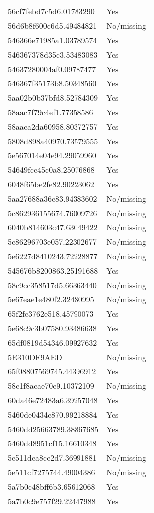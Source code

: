 \begin{tabular}{ll}
56cf7febd7c5d6.01783290 & Yes \\
56d6b8f600c6d5.49484821 & No/missing \\
546366e71985a1.03789574 & Yes \\
546367378d35c3.53483083 & Yes \\
54637280004af0.09787477 & Yes \\
546367f35173b8.50348560 & Yes \\
5aa02b0b37bfd8.52784309 & Yes \\
58aac7f79c4ef1.77358586 & Yes \\
58aaca2da60958.80372757 & Yes \\
5808d898a40970.73579555 & Yes \\
5e567014e04e94.29059960 & Yes \\
54649fce45c0a8.25076868 & Yes \\
6048f65be2fe82.90223062 & Yes \\
5aa27688a36e83.94383602 & No/missing \\
5c862936155674.76009726 & No/missing \\
6040b814603c47.63049422 & No/missing \\
5c86296703e057.22302677 & No/missing \\
5e6227d8410243.72228877 & No/missing \\
545676b8200863.25191688 & Yes \\
58c9cc358517d5.66363440 & No/missing \\
5e67eae1e480f2.32480995 & No/missing \\
65f2fc3762e518.45790073 & Yes \\
5e68c9c3b07580.93486638 & Yes \\
65df0819d54346.09927632 & Yes \\
5E310DF9AED & No/missing \\
65f08807569745.44396912 & Yes \\
58c1f8acae70e9.10372109 & No/missing \\
60da46e72483a6.39257048 & Yes \\
5460de0434c870.99218884 & Yes \\
5460dd25663789.38867685 & Yes \\
5460dd8951cf15.16610348 & Yes \\
5e511dea8ce2d7.36991881 & No/missing \\
5e511cf7275744.49004386 & No/missing \\
5a7b0c48bff6b3.65612068 & Yes \\
5a7b0c9e757f29.22447988 & Yes \\

\end{tabular}
